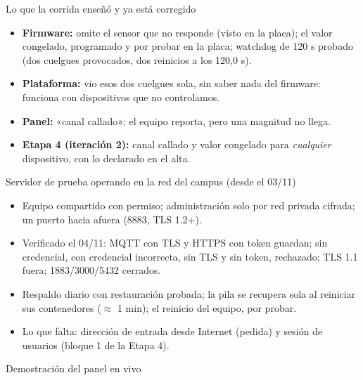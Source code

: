 \documentclass[aspectratio=169,11pt]{beamer}
\gdef\lafuente{}
\newcommand{\fuente}[1]{\gdef\lafuente{#1}}
\begin{document}
\begin{frame}{Lo que la corrida enseñó y ya está corregido}
  \begin{itemize}
    \item \textbf{Firmware:} omite el sensor que no responde (visto en la placa); el valor congelado, programado y por probar en la
      placa; watchdog de 120 s probado (dos cuelgues provocados, dos reinicios a los 120,0 s).
    \item \textbf{Plataforma:} vio esos dos cuelgues sola, sin saber nada del firmware: funciona con dispositivos que no
      controlamos.
    \item \textbf{Panel:} «canal callado»: el equipo reporta, pero una magnitud no llega.
    \item \textbf{Etapa 4 (iteración 2):} canal callado y valor congelado para \emph{cualquier} dispositivo, con lo declarado en el alta.
  \end{itemize}
  \fuente{docs/16 §53 y §54; docs/17}
\end{frame}

\begin{frame}{Servidor de prueba operando en la red del campus (desde el 03/11)}
  \footnotesize
  \begin{itemize}
    \item Equipo compartido con permiso; administración solo por red privada cifrada; un puerto hacia afuera (8883, TLS 1.2+).
    \item Verificado el 04/11: MQTT con TLS y HTTPS con token guardan; sin credencial, con credencial incorrecta, sin TLS y sin
      token, rechazado; TLS 1.1 fuera; 1883/3000/5432 cerrados.
    \item Respaldo diario con restauración probada; la pila se recupera sola al reiniciar sus contenedores ($\approx$ 1 min); el reinicio del equipo, por probar.
    \item Lo que falta: dirección de entrada desde Internet (pedida) y sesión de usuarios (bloque 1 de la Etapa 4).
  \end{itemize}
  \fuente{docs/14 §7.4; bitácora del 03--04/11}
\end{frame}

\begin{frame}[standout]
  Demostración del panel en vivo
\end{frame}
\end{document}
